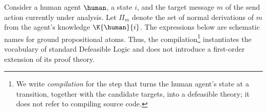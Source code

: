 
Consider a human agent $\human$, a state $i$, and the target message $m$ of the send action currently under analysis. Let $\Pi_m$ denote the set of normal derivations of $m$ from the agent's knowledge $\K{\human}{i}$. The expressions below are schematic names for ground propositional atoms. Thus, the compilation\footnote{We write \emph{compilation} for the step that turns the human agent's state at a transition, together with the candidate targets, into a defeasible theory; it does not refer to compiling source code.} instantiates the vocabulary of standard Defeasible Logic and does not introduce a first-order extension of its proof theory.

